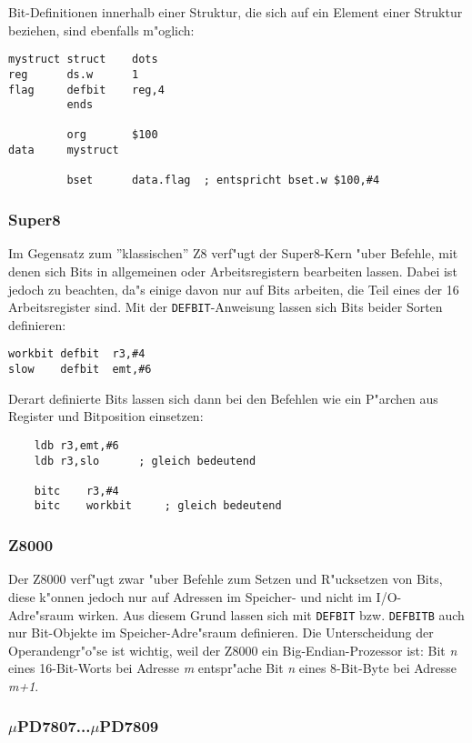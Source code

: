 \documentclass[12pt,a4paper,twoside]{report}
\newcommand{\tty}[1]{{\tt #1}}
\begin{document}
Bit-Definitionen innerhalb einer Struktur, die sich auf ein Element
einer Struktur beziehen, sind ebenfalls m"oglich:
\begin{verbatim}
mystruct struct    dots
reg      ds.w      1
flag     defbit    reg,4
         ends

         org       $100
data     mystruct

         bset      data.flag  ; entspricht bset.w $100,#4
\end{verbatim}

\subsubsection{Super8}

Im Gegensatz zum ''klassischen'' Z8 verf"ugt der Super8-Kern "uber
Befehle, mit denen sich Bits in allgemeinen oder Arbeitsregistern
bearbeiten lassen.  Dabei ist jedoch zu beachten, da"s einige davon
nur auf Bits arbeiten, die Teil eines der 16 Arbeitsregister sind.
Mit der \tty{DEFBIT}-Anweisung lassen sich Bits beider Sorten
definieren:
\begin{verbatim}
workbit	defbit	r3,#4
slow	defbit	emt,#6
\end{verbatim}
Derart definierte Bits lassen sich dann bei den Befehlen wie ein
P"archen aus Register und Bitposition einsetzen:
\begin{verbatim}
	ldb	r3,emt,#6
	ldb	r3,slo		; gleich bedeutend

	bitc	r3,#4
	bitc	workbit		; gleich bedeutend
\end{verbatim}

\subsubsection{Z8000}

Der Z8000 verf"ugt zwar "uber Befehle zum Setzen und R"ucksetzen
von Bits, diese k"onnen jedoch nur auf Adressen im Speicher- und nicht
im I/O-Adre"sraum wirken.  Aus diesem Grund lassen sich mit {\tt DEFBIT}
bzw. {\tt DEFBITB} auch nur Bit-Objekte im Speicher-Adre"sraum definieren.
Die Unterscheidung der Operandengr"o"se ist wichtig, weil der Z8000 ein
Big-Endian-Prozessor ist: Bit {\em n} eines 16-Bit-Worts bei Adresse {\em m}
entspr"ache Bit {\em n} eines 8-Bit-Byte bei Adresse {\em m+1}.

\subsubsection{$\mu$PD7807...$\mu$PD7809}
\end{document}
